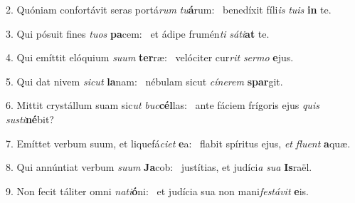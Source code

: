 2. Quóniam confortávit seras portá\textit{rum} \textit{tu}\textbf{á}rum: \ast\  benedíxit fíli\textit{is} \textit{tu}\textit{is} \textbf{in} te.\

3. Qui pósuit fines \textit{tu}\textit{os} \textbf{pa}cem: \ast\  et ádipe frumén\textit{ti} \textit{sá}\textit{ti}\textbf{at} te.\

4. Qui emíttit elóquium \textit{su}\textit{um} \textbf{ter}ræ: \ast\  velóciter cur\textit{rit} \textit{ser}\textit{mo} \textbf{e}jus.\

5. Qui dat nivem \textit{sic}\textit{ut} \textbf{la}nam: \ast\  nébulam sicut \textit{cí}\textit{ne}\textit{rem} \textbf{spar}git.\

6. Mittit crystállum suam sic\textit{ut} \textit{buc}\textbf{cél}las: \ast\  ante fáciem frígoris ejus \textit{quis} \textit{sus}\textit{ti}\textbf{né}bit?\

7. Emíttet verbum suum, et liquefá\textit{ci}\textit{et} \textbf{e}a: \ast\  flabit spíritus ejus, \textit{et} \textit{flu}\textit{ent} \textbf{a}quæ.\

8. Qui annúntiat verbum \textit{su}\textit{um} \textbf{Ja}cob: \ast\  justítias, et judíci\textit{a} \textit{su}\textit{a} \textbf{Is}raël.\

9. Non fecit táliter omni \textit{na}\textit{ti}\textbf{ó}ni: \ast\  et judícia sua non mani\textit{fes}\textit{tá}\textit{vit} \textbf{e}is.\

